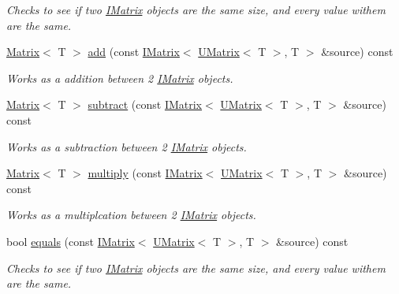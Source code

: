 \begin{DoxyCompactItemize}
\begin{DoxyCompactList}\small\item\em Checks to see if two \mbox{\hyperlink{class_i_matrix}{I\+Matrix}} objects are the same size, and every value withem are the same. \end{DoxyCompactList}\item 
\mbox{\hyperlink{class_matrix}{Matrix}}$<$ T $>$ \mbox{\hyperlink{class_s_matrix_a99cf55b562b27e77f3564f3aed5cff6d}{add}} (const \mbox{\hyperlink{class_i_matrix}{I\+Matrix}}$<$ \mbox{\hyperlink{class_u_matrix}{U\+Matrix}}$<$ T $>$, T $>$ \&source) const
\begin{DoxyCompactList}\small\item\em Works as a addition between 2 \mbox{\hyperlink{class_i_matrix}{I\+Matrix}} objects. \end{DoxyCompactList}\item 
\mbox{\hyperlink{class_matrix}{Matrix}}$<$ T $>$ \mbox{\hyperlink{class_s_matrix_a0dc67bdaf9cc1a9bb33d16a957831c43}{subtract}} (const \mbox{\hyperlink{class_i_matrix}{I\+Matrix}}$<$ \mbox{\hyperlink{class_u_matrix}{U\+Matrix}}$<$ T $>$, T $>$ \&source) const
\begin{DoxyCompactList}\small\item\em Works as a subtraction between 2 \mbox{\hyperlink{class_i_matrix}{I\+Matrix}} objects. \end{DoxyCompactList}\item 
\mbox{\hyperlink{class_matrix}{Matrix}}$<$ T $>$ \mbox{\hyperlink{class_s_matrix_a66f229dfaa83ff1a5c9115e8dcfa1d9e}{multiply}} (const \mbox{\hyperlink{class_i_matrix}{I\+Matrix}}$<$ \mbox{\hyperlink{class_u_matrix}{U\+Matrix}}$<$ T $>$, T $>$ \&source) const
\begin{DoxyCompactList}\small\item\em Works as a multiplcation between 2 \mbox{\hyperlink{class_i_matrix}{I\+Matrix}} objects. \end{DoxyCompactList}\item 
bool \mbox{\hyperlink{class_s_matrix_a00a5325d79d72dbc893bd1bdb0ee4ff4}{equals}} (const \mbox{\hyperlink{class_i_matrix}{I\+Matrix}}$<$ \mbox{\hyperlink{class_u_matrix}{U\+Matrix}}$<$ T $>$, T $>$ \&source) const
\begin{DoxyCompactList}\small\item\em Checks to see if two \mbox{\hyperlink{class_i_matrix}{I\+Matrix}} objects are the same size, and every value withem are the same. \end{DoxyCompactList}\item 

\end{DoxyCompactItemize}
